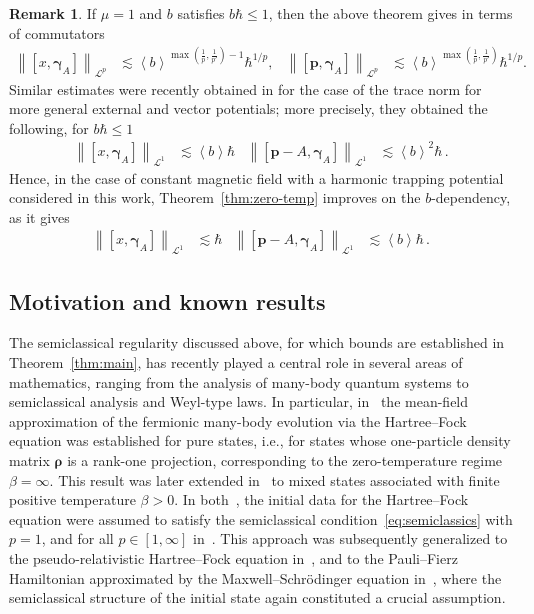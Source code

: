 \documentclass[11pt]{amsart}
\theoremstyle{plain}
\theoremstyle{definition}
\newtheorem{remark}[theorem]{Remark}
\renewcommand	{\L}		{\mathcal L}		%
\newcommand		{\lt}			{\left}				%
\newcommand		{\rt}			{\right}			%
\renewcommand	{\(}			{\lt(}
\renewcommand	{\)}			{\rt)}
\newcommand		{\bangle}[1]	{\lt\langle #1\rt\rangle}
\newcommand		{\weight}[1]	{\bangle{#1}}	%
\newcommand		{\com}[1]		{\lt[{#1}\rt]}		%
\newcommand		{\nrm}[1]		{\lt\lVert #1\rt\rVert}
\newcommand		{\Nrm}[2]		{\nrm{#1}_{#2}}
\newcommand		{\op}		{{\boldsymbol{\rho}}}%
\newcommand		{\opgam}	{{\boldsymbol{\gamma}}}	%
\newcommand		{\opp}		{\boldsymbol{p}}
\begin{document}
    \begin{remark}\label{rmk:magnetic}
        If $\mu=1$ and $b$ satisfies $b\hbar \leq 1$, then the above theorem gives in terms of commutators
		\begin{align*}
			\Nrm{\com{x,\opgam_{A}}}{\L^p} &\lesssim \weight{b}^{\max(\frac{1}{p},\frac{1}{p'})-1} \hbar^{1/p},
			&
			\Nrm{\com{\opp,\opgam_{A}}}{\L^p} &\lesssim  \weight{b}^{\max(\frac{1}{p},\frac{1}{p'})} \hbar^{1/p}  .
		\end{align*}
        Similar estimates were recently obtained in \cite[Theorem 1]{benedikter_derivation_2025} for the case of the trace norm for more general external and vector potentials; more precisely, they obtained the following, for $b\hbar\leq 1$
        \begin{align*}
            \Nrm{\com{x,\opgam_{A}}}{\L^1} &\lesssim  \weight{b}\hbar
            &
            \Nrm{\com{\opp-A,\opgam_{A}}}{\L^1} &\lesssim  \weight{b}^{2} \hbar \,.
        \end{align*}
        Hence, in the case of constant magnetic field with a harmonic trapping potential considered in this work, Theorem~\ref{thm:zero-temp} improves on the $b$-dependency, as it gives
		\begin{align*}
			\Nrm{\com{x,\opgam_{A}}}{\L^1} &\lesssim \hbar
			&
			\Nrm{\com{\opp-A,\opgam_{A}}}{\L^1} &\lesssim  \weight{b} \hbar \, .
		\end{align*}
    \end{remark}

\subsection{Motivation and known results}

	The semiclassical regularity discussed above, for which bounds are established in Theorem~\ref{thm:main}, has recently played a central role in several areas of mathematics, ranging from the analysis of many-body quantum systems to semiclassical analysis and Weyl-type laws. In particular, in~\cite{benedikter_mean-field_2014} the mean-field approximation of the fermionic many-body evolution via the Hartree--Fock equation was established for pure states, i.e., for states whose one-particle density matrix $\op$ is a rank-one projection, corresponding to the zero-temperature regime $\beta=\infty$. This result was later extended in~\cite{benedikter_mean-field_2016, chong_many-body_2024} to mixed states associated with finite positive temperature $\beta>0$.
    In both~\cite{benedikter_mean-field_2014, benedikter_mean-field_2016}, the initial data for the Hartree--Fock equation were assumed to satisfy the semiclassical condition~\eqref{eq:semiclassics} with $p=1$, and for all $p\in[1,\infty]$ in~\cite{chong_many-body_2024}. This approach was subsequently generalized to the pseudo-relativistic Hartree--Fock equation in~\cite{benedikter_mean-field_2014-1}, and to the Pauli--Fierz Hamiltonian approximated by the Maxwell--Schr\"odinger equation in~\cite{leopold_derivation_2024}, where the semiclassical structure of the initial state again constituted a crucial assumption.
    
\end{document}
